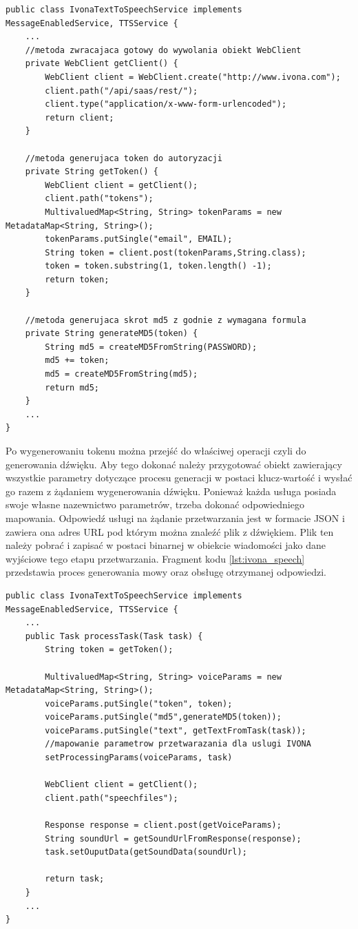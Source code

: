 \begin{center}
\begin{lstlisting}
public class IvonaTextToSpeechService implements MessageEnabledService, TTSService {
	...
	//metoda zwracajaca gotowy do wywolania obiekt WebClient
	private WebClient getClient() {
		WebClient client = WebClient.create("http://www.ivona.com");
		client.path("/api/saas/rest/");
		client.type("application/x-www-form-urlencoded");
		return client;
	}

	//metoda generujaca token do autoryzacji
	private String getToken() {
		WebClient client = getClient();
		client.path("tokens");
		MultivaluedMap<String, String> tokenParams = new MetadataMap<String, String>();
		tokenParams.putSingle("email", EMAIL);
		String token = client.post(tokenParams,String.class);
		token = token.substring(1, token.length() -1);
		return token;
	}

	//metoda generujaca skrot md5 z godnie z wymagana formula
	private String generateMD5(token) {
		String md5 = createMD5FromString(PASSWORD);
		md5 += token;
		md5 = createMD5FromString(md5);
		return md5;
	}
	...
}
\end{lstlisting}
\end{center} 

Po wygenerowaniu tokenu można przejść do właściwej operacji czyli do generowania dźwięku. Aby tego dokonać należy przygotować obiekt zawierający wszystkie parametry dotyczące procesu generacji w postaci klucz-wartość i wysłać go razem z żądaniem wygenerowania dźwięku. Ponieważ każda usługa posiada swoje własne nazewnictwo parametrów, trzeba dokonać odpowiedniego mapowania. 
Odpowiedź usługi na żądanie przetwarzania jest w formacie JSON i zawiera ona adres URL pod którym można znaleźć plik z dźwiękiem. Plik ten należy pobrać i zapisać w postaci binarnej w obiekcie wiadomości jako dane wyjściowe tego etapu przetwarzania. Fragment kodu \ref{lst:ivona_speech} przedstawia proces generowania mowy oraz obsługę otrzymanej odpowiedzi.

\lstset{language=Java, tabsize=4, caption=Proces generowania tokenu usługi IVONA,label=lst:ivona_speech}

\begin{center}
\begin{lstlisting}
public class IvonaTextToSpeechService implements MessageEnabledService, TTSService {
	...
	public Task processTask(Task task) {
		String token = getToken();

		MultivaluedMap<String, String> voiceParams = new MetadataMap<String, String>();
		voiceParams.putSingle("token", token);
		voiceParams.putSingle("md5",generateMD5(token));
		voiceParams.putSingle("text", getTextFromTask(task));
		//mapowanie parametrow przetwarazania dla uslugi IVONA
		setProcessingParams(voiceParams, task)

		WebClient client = getClient();
		client.path("speechfiles");
	
		Response response = client.post(getVoiceParams);
		String soundUrl = getSoundUrlFromResponse(response);
		task.setOuputData(getSoundData(soundUrl);

		return task;
	}
	...
}
\end{lstlisting}
\end{center} 

